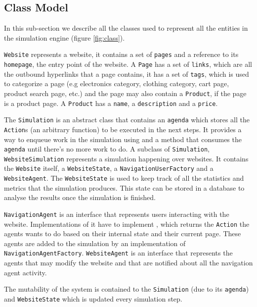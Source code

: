 \subsection{Class Model}

In this sub-section we describe all the classes used to represent all the 
entities in the simulation engine (figure \ref{fig:class}).

\texttt{Website} represents a website, it contains a set of \texttt{pages} and 
a reference to its \texttt{homepage}, the entry point of the website. A 
\texttt{Page} has a set of \texttt{links}, which are all the outbound 
hyperlinks that a page contains, it has a set of \texttt{tags}, which is used 
to categorize a page (e.g electronics category, clothing category, cart page, 
product search page, etc.) and the page may also contain a \texttt{Product}, if 
the page is a product page. A \texttt{Product} has a \texttt{name}, a 
\texttt{description} and a \texttt{price}.

The \texttt{Simulation} is an abstract class that contains an \texttt{agenda} 
which stores all the \texttt{Action}s (an arbitrary function) to be executed in 
the next steps. It provides a way to enqueue work in the simulation using 
 and a  method that consumes 
the \texttt{agenda} until there's no more work to do. A subclass of 
\texttt{Simulation}, \texttt{WebsiteSimulation} represents a simulation 
happening over websites. It contains the \texttt{Website} itself, a 
\texttt{WebsiteState}, a \texttt{NavigationUserFactory} and a 
\texttt{WebsiteAgent}. The \texttt{WebsiteState} is used to keep track of all 
the statistics and metrics that the simulation produces. This state can be 
stored in a database to analyse the results once the simulation is finished.

\texttt{NavigationAgent} is an interface that represents users interacting with 
the website. Implementations of it have to implement , 
which returns the \texttt{Action} the agents wants to do based on their 
internal state and their current page. These agents are added to the simulation 
by an implementation of \texttt{NavigationAgentFactory}. \texttt{WebsiteAgent} 
is an interface that represents the agents that may modify the website and that 
are notified about all the navigation agent activity.

The mutability of the system is contained to the \texttt{Simulation} (due to 
its \texttt{agenda}) and \texttt{WebsiteState} which is updated every 
simulation step.

